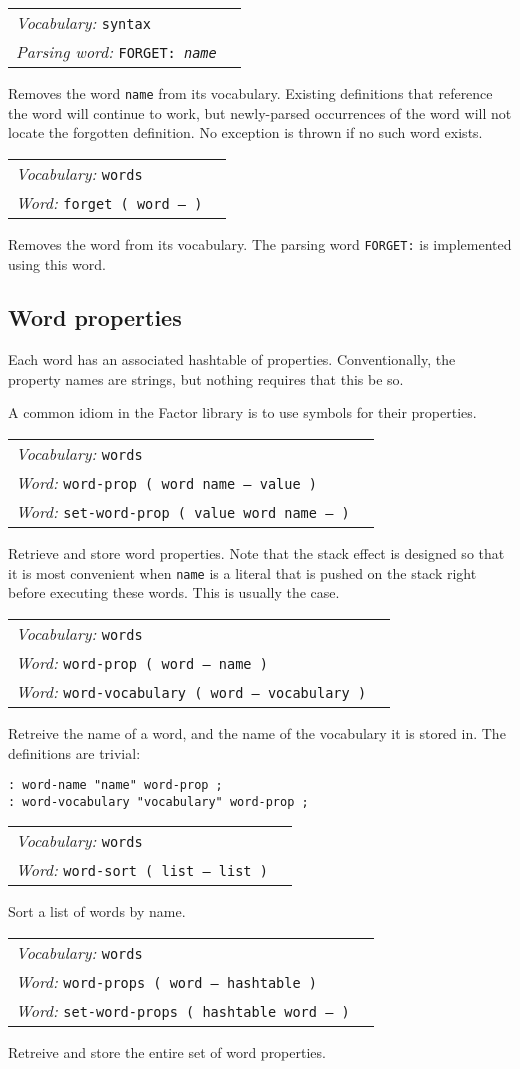 \documentclass{book}
\newcommand{\vocabulary}[1]{\emph{Vocabulary:} \texttt{#1}&\\}
\newcommand{\parsingword}[2]{\index{\texttt{#1}}\emph{Parsing word:} \texttt{#2}&\\}
\newcommand{\ordinaryword}[2]{\index{\texttt{#1}}\emph{Word:} \texttt{#2}&\\}
\newcommand{\wordtable}[1]{

\begin{tabularx}{12cm}[t]{lX}
\hline
#1
\hline
\end{tabularx}

}
\begin{document}
\wordtable{
\vocabulary{syntax}
\parsingword{FORGET:}{FORGET:~\emph{name}}
}
Removes the word \texttt{name} from its vocabulary. Existing definitions that reference the word will continue to work, but newly-parsed occurrences of the word will not locate the forgotten definition. No exception is thrown if no such word exists.
\wordtable{
\vocabulary{words}
\ordinaryword{forget}{forget ( word -- )}

}
Removes the word from its vocabulary. The parsing word \texttt{FORGET:} is implemented using this word.

\subsection{\label{word-props}Word properties}


Each word has an associated hashtable of properties. Conventionally, the property names are strings, but nothing requires that this be so.

A common idiom in the Factor library is to use symbols for their properties. 

\wordtable{
\vocabulary{words}
\ordinaryword{word-prop}{word-prop ( word name -- value )}
\ordinaryword{set-word-prop}{set-word-prop ( value word name -- )}

}
Retrieve and store word properties. Note that the stack effect is designed so that it is most convenient when \texttt{name} is a literal that is pushed on the stack right before executing these words. This is usually the case.

\wordtable{
\vocabulary{words}
\ordinaryword{word-name}{word-prop ( word -- name )}
\ordinaryword{word-vocabulary}{word-vocabulary ( word -- vocabulary )}

}
Retreive the name of a word, and the name of the vocabulary it is stored in. The definitions are trivial:
\begin{verbatim}
: word-name "name" word-prop ;
: word-vocabulary "vocabulary" word-prop ;
\end{verbatim}

\wordtable{
\vocabulary{words}
\ordinaryword{word-sort}{word-sort ( list -- list )}

}
Sort a list of words by name.

\wordtable{
\vocabulary{words}
\ordinaryword{word-props}{word-props ( word -- hashtable )}
\ordinaryword{set-word-props}{set-word-props ( hashtable word -- )}

}
Retreive and store the entire set of word properties.
\end{document}
